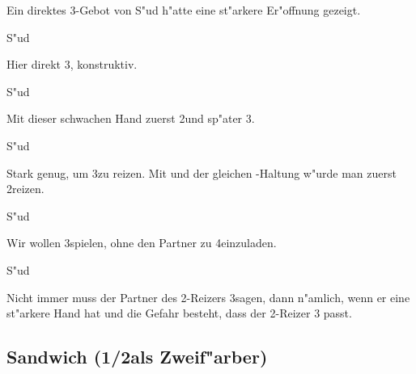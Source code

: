 Ein direktes 3\tre-Gebot von S"ud h"atte eine st"arkere Er"offnung gezeigt.

S"ud \\

Hier direkt 3\kar, konstruktiv.

S"ud \\

Mit dieser schwachen Hand zuerst 2\SA und sp"ater 3\kar.

S"ud \\

Stark genug, um 3\kar zu reizen. Mit \co{}\hspace{\cardskip}
und der gleichen \ka-Haltung w"urde man zuerst 2\SA reizen.

S"ud \\

Wir wollen 3\coe spielen, ohne den Partner zu 4\coe einzuladen.

S"ud \\

Nicht immer muss der Partner des 2\SA-Reizers 3\tre sagen, dann n"amlich, wenn
er eine st"arkere Hand hat und die Gefahr besteht, dass der 2\SA-Reizer 3\tre
passt.

\subsection{Sandwich \nt (1\SA/2\SA als Zweif"arber)}

